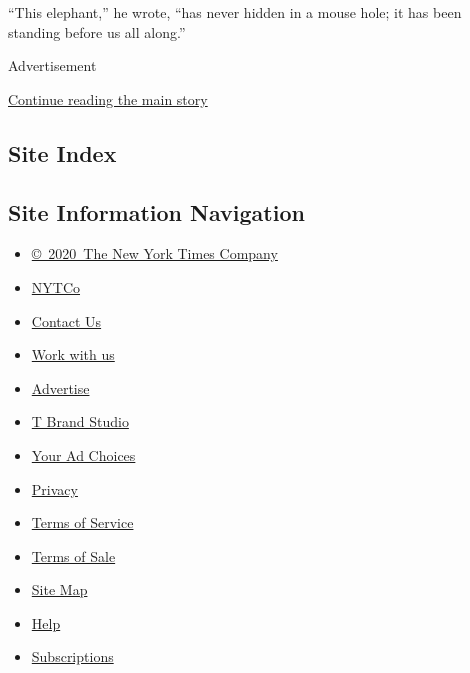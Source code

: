 ``This elephant,'' he wrote, ``has never hidden in a mouse hole; it has
been standing before us all along.''

Advertisement

\protect\hyperlink{after-bottom}{Continue reading the main story}

\hypertarget{site-index}{%
\subsection{Site Index}\label{site-index}}

\hypertarget{site-information-navigation}{%
\subsection{Site Information
Navigation}\label{site-information-navigation}}

\begin{itemize}
\tightlist
\item
  \href{https://help.nytimes.com/hc/en-us/articles/115014792127-Copyright-notice}{©~2020~The
  New York Times Company}
\end{itemize}

\begin{itemize}
\tightlist
\item
  \href{https://www.nytco.com/}{NYTCo}
\item
  \href{https://help.nytimes.com/hc/en-us/articles/115015385887-Contact-Us}{Contact
  Us}
\item
  \href{https://www.nytco.com/careers/}{Work with us}
\item
  \href{https://nytmediakit.com/}{Advertise}
\item
  \href{http://www.tbrandstudio.com/}{T Brand Studio}
\item
  \href{https://www.nytimes.com/privacy/cookie-policy\#how-do-i-manage-trackers}{Your
  Ad Choices}
\item
  \href{https://www.nytimes.com/privacy}{Privacy}
\item
  \href{https://help.nytimes.com/hc/en-us/articles/115014893428-Terms-of-service}{Terms
  of Service}
\item
  \href{https://help.nytimes.com/hc/en-us/articles/115014893968-Terms-of-sale}{Terms
  of Sale}
\item
  \href{https://spiderbites.nytimes.com}{Site Map}
\item
  \href{https://help.nytimes.com/hc/en-us}{Help}
\item
  \href{https://www.nytimes.com/subscription?campaignId=37WXW}{Subscriptions}
\end{itemize}
